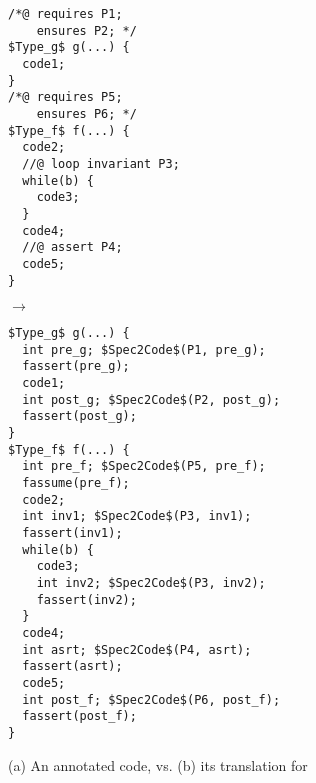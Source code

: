 \begin{figure}[tb]
\begin{minipage}{0.4\columnwidth}
\begin{lstlisting}[mathescape]
/*@ requires P1;
    ensures P2; */
$Type_g$ g(...) {
  code1;
}
/*@ requires P5;
    ensures P6; */
$Type_f$ f(...) {
  code2;
  //@ loop invariant P3;
  while(b) {
    code3;
  }
  code4;
  //@ assert P4;
  code5;
}
\end{lstlisting}
\end{minipage}
\hspace{-6mm}
\begin{minipage}{0.07\columnwidth}$\to$\end{minipage}
\begin{minipage}{0.6\columnwidth}
\begin{lstlisting}[mathescape]
$Type_g$ g(...) {
  int pre_g; $Spec2Code$(P1, pre_g);
  fassert(pre_g);
  code1; 
  int post_g; $Spec2Code$(P2, post_g);
  fassert(post_g);
}
$Type_f$ f(...) {
  int pre_f; $Spec2Code$(P5, pre_f);
  fassume(pre_f);
  code2;
  int inv1; $Spec2Code$(P3, inv1);
  fassert(inv1);
  while(b) {
    code3;
    int inv2; $Spec2Code$(P3, inv2);
    fassert(inv2);
  }
  code4;
  int asrt; $Spec2Code$(P4, asrt);
  fassert(asrt);
  code5;
  int post_f; $Spec2Code$(P6, post_f);
  fassert(post_f);
}
\end{lstlisting}
\end{minipage}
\caption{(a) An annotated code, vs.  (b) its translation for \NCD}
\label{fig:NC-transf}
\end{figure}



